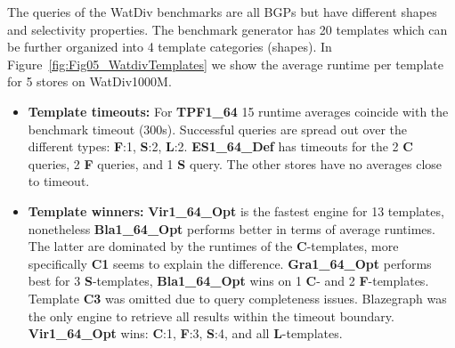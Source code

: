 The queries of the WatDiv benchmarks are all BGPs but have different shapes and selectivity properties. The benchmark generator has 20 templates which can be further organized into 4 template categories (shapes). 
 In Figure~\ref{fig:Fig05_WatdivTemplates} we show the average runtime per template for 5 stores on WatDiv1000M.
\begin{itemize}
	\item \textbf{Template timeouts:} For \textbf{TPF1\_64} 15 runtime averages coincide with the benchmark timeout (300s). Successful queries are spread out over the different types: \textbf{F}:1, \textbf{S}:2, \textbf{L}:2.
	\textbf{ES1\_64\_Def} has timeouts for the 2 \textbf{C} queries,  2 \textbf{F} queries, and 1 \textbf{S} query. The other stores have no averages close to timeout.
	
	\item  \textbf{Template winners:} \textbf{Vir1\_64\_Opt} is the fastest engine for 13 templates, nonetheless \textbf{Bla1\_64\_Opt} performs better in terms of average runtimes. The latter are dominated by the runtimes of the \textbf{C}-templates, more specifically \textbf{C1} seems to explain the difference. 
	\textbf{Gra1\_64\_Opt} performs best for 3 \textbf{S}-templates, \textbf{Bla1\_64\_Opt} wins on 1 \textbf{C}- and 2 \textbf{F}-templates. Template \textbf{C3} was omitted due to query completeness issues. Blazegraph was the only engine to retrieve all results within the timeout boundary.
	\textbf{Vir1\_64\_Opt} wins: \textbf{C}:1, \textbf{F}:3, \textbf{S}:4, and all \textbf{L}-templates.
\end{itemize}

